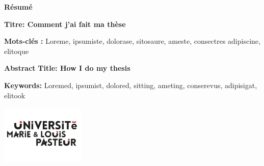 \newpage
\thispagestyle{empty}

\hrulefill
\vspace*{2mm}
\par\noindent\textbf
{\color{blue}\Large\bfseries Résumé }

{\bfseries{} Titre:  Comment j'ai fait ma thèse}


\vspace*{2mm}

\lipsum[1-2]
\vspace*{0.5mm}
\par\noindent\textbf
{\bfseries {Mots-clés :}}
Loreme, ipsumiste, dolorase, sitosaure, ameste, consectres adipiscine, elitoque

\vspace*{0.5mm}
\hrulefill
\vspace*{2mm}




\par\noindent\textbf{\color{blue}\Large\bfseries Abstract } {\bfseries  {} Title:  How I do my thesis}

\lipsum[1-2]
\vspace*{1mm}
\par\noindent\textbf
{\bfseries {Keywords:}}
Loremed, ipsumist, dolored, sitting, ameting, conserevus, adipisigat, elitook

\includegraphics[width=4cm]{MainLayout/Images/logo_univ.pdf}